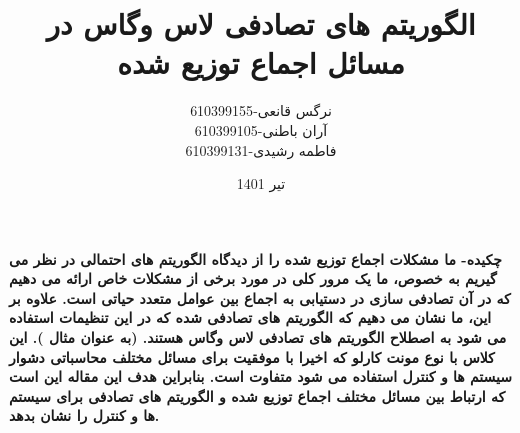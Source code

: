 \documentclass[12pt]{article} %
\title{الگوریتم های تصادفی لاس وگاس در مسائل اجماع توزیع شده}
\author{نرگس قانعی-610399155\\آران باطنی-610399105\\فاطمه رشیدی-610399131}
\date{تیر 1401}
\begin{document}
	\maketitle

	\textbf{چکیده- ما مشکلات اجماع توزیع شده را از دیدگاه الگوریتم های احتمالی در نظر می گیریم
    به خصوص،
    ما یک مرور کلی در مورد برخی از مشکلات خاص ارائه می دهیم
    که در آن
    تصادفی سازی در دستیابی به اجماع بین عوامل متعدد حیاتی است.
    علاوه بر این، ما نشان می دهیم که الگوریتم های تصادفی شده 
    که در این تنظیمات استفاده می شود به اصطلاح الگوریتم های تصادفی لاس وگاس هستند.
     (به عنوان مثال \cite{bib24}).
     این کلاس با نوع مونت کارلو که اخیرا 
     با موفقیت برای مسائل
     مختلف محاسباتی دشوار سیستم ها و کنترل استفاده می شود متفاوت است.
    بنابراین هدف این مقاله این است که
    ارتباط بین مسائل مختلف اجماع توزیع شده 
    و الگوریتم های تصادفی برای سیستم ها و کنترل را نشان بدهد.}

	\tableofcontents
	\newpage
\end{document}
